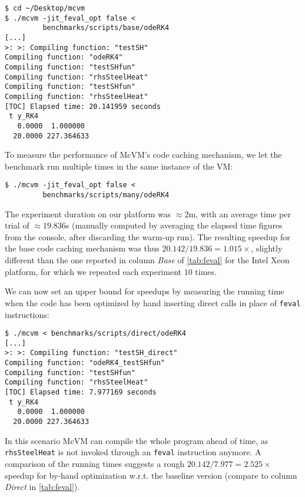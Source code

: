 \begin{small}
\begin{verbatim}
$ cd ~/Desktop/mcvm
$ ./mcvm -jit_feval_opt false <
         benchmarks/scripts/base/odeRK4
[...]
>: >: Compiling function: "testSH"
Compiling function: "odeRK4"
Compiling function: "testSHfun"
Compiling function: "rhsSteelHeat"
Compiling function: "testSHfun"
Compiling function: "rhsSteelHeat"
[TOC] Elapsed time: 20.141959 seconds
 t y_RK4
   0.0000  1.000000
  20.0000 227.364633
\end{verbatim}
\end{small}

\noindent To measure the performance of McVM's code caching mechanism, we let the benchmark run multiple times in the same instance of the VM:

\begin{small}
\begin{verbatim}
$ ./mcvm -jit_feval_opt false <
         benchmarks/scripts/many/odeRK4
\end{verbatim}
\end{small}

\noindent The experiment duration on our platform was $\approx2$m, with an average time per trial of $\approx 19.836$s (manually computed by averaging the elapsed time figures from the console, after discarding the warm-up run). The resulting speedup for the base code caching mechanism was thus $20.142/19.836=1.015\times$, slightly different than the one reported in column {\em Base} of \mytable\ref{tab:feval} for the Intel Xeon platform, for which we repeated each experiment $10$ times.

We can now set an upper bound for speedups by measuring the running time when the code has been optimized by hand inserting direct calls in place of {\tt feval} instructions:

\begin{small}
\begin{verbatim}
$ ./mcvm < benchmarks/scripts/direct/odeRK4
[...]
>: >: Compiling function: "testSH_direct"
Compiling function: "odeRK4_testSHfun"
Compiling function: "testSHfun"
Compiling function: "rhsSteelHeat"
[TOC] Elapsed time: 7.977169 seconds
 t y_RK4
   0.0000  1.000000
  20.0000 227.364633
\end{verbatim}
\end{small}

\noindent In this scenario McVM can compile the whole program ahead of time, as {\tt rhsSteelHeat} is not invoked through an {\tt feval} instruction anymore. A comparison of the running times suggests a rough $20.142/7.977=2.525\times$ speedup for by-hand optimization w.r.t. the baseline version (compare to column {\em Direct} in \mytable\ref{tab:feval}).

